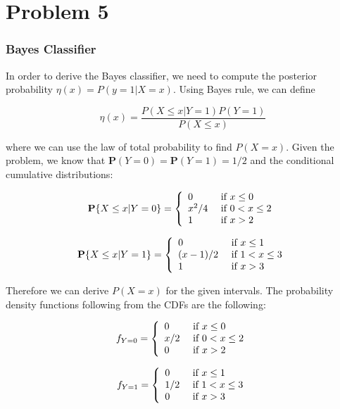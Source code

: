 \documentclass[a4paper, 11pt]{article} %
\begin{document}
\section*{Problem 5} 

\subsubsection*{Bayes Classifier}

In order to derive the Bayes classifier, we need to compute the posterior probability $\eta ( x ) = P ( y = 1 | X = x )$. Using Bayes rule, we can define 

$$\eta(x) = \frac{P(X \leq x | Y = 1) P(Y = 1)}{P(X\leq x)}$$

where we can use the law of total probability to find $P(X=x)$. Given the problem, we know that $\mathbf { P } ( Y = 0 ) = \mathbf { P } ( Y = 1 ) = 1 / 2$ and the conditional cumulative distributions:

$$\mathbf { P } \{ X \leq x | Y = 0 \} = \left\{ \begin{array} { l l } { 0 } & { \text { if } x \leq 0 } \\ { x ^ { 2 } / 4 } & { \text { if } 0 < x \leq 2 } \\ { 1 } & { \text { if } x > 2 } \end{array} \right.$$

$$\mathbf { P } \{ X \leq x | Y = 1 \} = \left\{ \begin{array} { l l } { 0 } & { \text { if } x \leq 1 } \\ { ( x - 1 ) / 2 } & { \text { if } 1 < x \leq 3 } \\ { 1 } & { \text { if } x > 3 } \end{array} \right.$$

Therefore we can derive $P(X=x)$ for the given intervals. The probability density functions following from the CDFs are the following:

$$f_{Y=0} = \left\{ \begin{array} { l l } { 0 } & { \text { if } x \leq 0 } \\ { x  / 2 } & { \text { if } 0 < x \leq 2 } \\ { 0 } & { \text { if } x > 2 } \end{array} \right.$$

$$f_{Y=1} = \left\{ \begin{array} { l l } { 0 } & { \text { if } x \leq 1 } \\ { 1/2} & { \text { if } 1 < x \leq 3 } \\ { 0 } & { \text { if } x > 3 } \end{array} \right.$$
\end{document}
